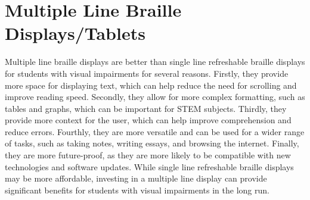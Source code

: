 \section{Multiple Line Braille Displays/Tablets}\label{multiple-line-refreshable-braille-displaystablets}
Multiple line braille displays are better than single line refreshable braille displays for students with visual impairments for several reasons. Firstly, they provide more space for displaying text, which can help reduce the need for scrolling and improve reading speed. Secondly, they allow for more complex formatting, such as tables and graphs, which can be important for STEM subjects. Thirdly, they provide more context for the user, which can help improve comprehension and reduce errors. Fourthly, they are more versatile and can be used for a wider range of tasks, such as taking notes, writing essays, and browsing the internet. Finally, they are more future-proof, as they are more likely to be compatible with new technologies and software updates. While single line refreshable braille displays may be more affordable, investing in a multiple line display can provide significant benefits for students with visual impairments in the long run.

